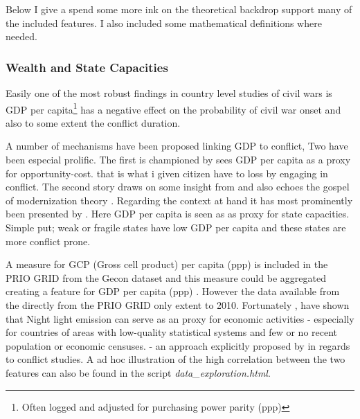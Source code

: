 \documentclass[a4paper]{article}
\begin{document}
Below I give a spend some more ink on the theoretical backdrop support many of the included features. I also included some mathematical definitions where needed.

\subsubsection{Wealth and State Capacities}

 Easily one of the most robust findings in country level studies of civil wars is GDP per capita\footnote{Often logged and adjusted for purchasing power parity (ppp)} has a negative effect on the probability of civil war onset \citep{Collier_Hoeffler_1998, Fearon_Laitin_2003, Collier_Hoeffler_2004, Hegre_Sambanis_2006, Blattman_Miguel_2010} and also to some extent the conflict duration\citep{Fearon_2004, Hegre_Oestby_Raleigh_2009}.\par
 
 A number of mechanisms have been proposed linking GDP to conflict, Two have been especial prolific. The first is championed by \cite{Collier_Hoeffler_1998, Collier_Hoeffler_2004} sees GDP per capita as a proxy for opportunity-cost. that is what i given citizen have to loss by engaging in conflict. The second story draws on some insight from \cite{Skocpol_1979} and also echoes the gospel of modernization theory \citep{Lipset_1959}. Regarding the context at hand it has most prominently been presented by \cite{Fearon_Laitin_2003}. Here GDP per capita is seen as as proxy for state capacities. Simple put; weak or fragile states have low GDP per capita and these states are more conflict prone\citep[88]{Fearon_Laitin_2003}.\par
 
 A measure for GCP (Gross cell product) per capita (ppp) is included in the PRIO GRID from the Gecon dataset \citep{Nordhaus_2006} and this measure could be aggregated creating a feature for GDP per capita (ppp) \citep{prio_code_2015}. However the data available from the directly from the PRIO GRID only extent to 2010. Fortunately \cite{Elvidge_2009}, \cite{Chen_Nordhuas_2011} have shown that Night light emission can serve as an proxy for economic activities - especially for countries of areas with low-quality statistical systems and few or no recent population or economic censuses. \citep{Chen_Nordhuas_2011} - an approach explicitly proposed by \cite[p. 101]{Cederman_Gleditsch_Buhaug_2013} in regards to conflict studies. A ad hoc illustration of the high correlation between the two features can also be found in the script \emph{data\_exploration.html}.\par
 
\end{document}
